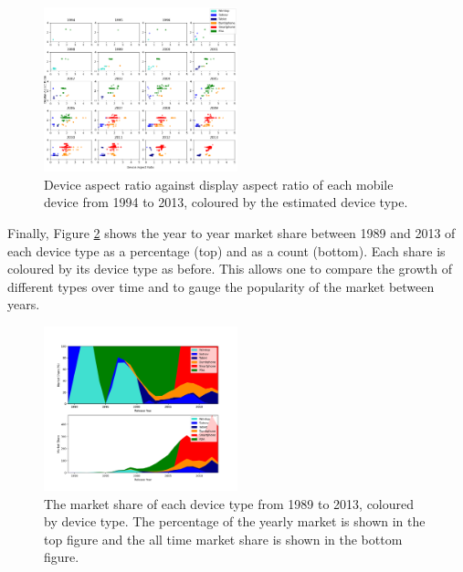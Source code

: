\documentclass[conference]{IEEEtran}
\begin{document}
\begin{figure}
    \centering
    \includegraphics[width=0.5\textwidth]{../Visualisations/B/dr-r-ctype-syear.png}
    \caption{Device aspect ratio against display aspect ratio of each mobile
	device from 1994 to 2013, coloured by the estimated device type.}
    \label{fig:AspectRatioYear}
\end{figure}


Finally, Figure \ref{fig:MarketShareYear} shows the year to year market share
between 1989 and 2013 of each device type as a percentage (top) and as a count
(bottom). Each share is coloured by its device type as before. This allows
one to compare the growth of different types over time and to gauge the popularity of the market between years.


\begin{figure}
    \centering
    \includegraphics[width=0.5\textwidth]{../Visualisations/B/share-year.png}
    \caption{The market share of each device type from 1989 to 2013,
	coloured by device type. The percentage of the yearly market is shown
	in the top figure and the all time market share is shown in the
	bottom figure.}
    \label{fig:MarketShareYear}
\end{figure}
\end{document}
